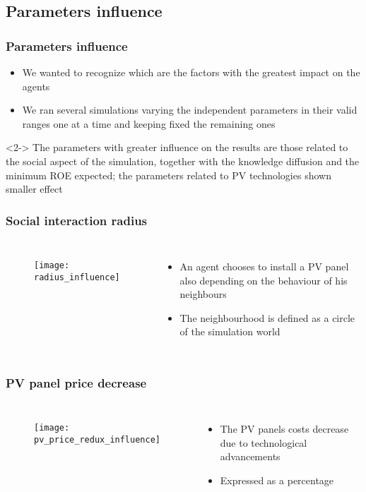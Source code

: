 \documentclass{beamer}
\begin{document}
\subsection{Parameters influence}
	\begin{frame}
	\frametitle{Parameters influence}
		\begin{itemize}
			\item We wanted to recognize which are the factors with the greatest impact on the agents
			\item We ran several simulations varying the independent parameters in their valid ranges one at a time and keeping fixed the remaining ones
		\end{itemize}
		\begin{block}<2->{}
		The parameters with greater influence on the results are those related to the social aspect of the simulation, together with the knowledge diffusion and the minimum ROE expected; the parameters related to PV technologies shown smaller effect
		\end{block}
	\end{frame}
	
	\begin{frame}
	\frametitle{Social interaction radius}
		\begin{columns}
  			\column{.6\textwidth}
			\begin{figure}
			\texttt{[image: radius\_influence]}
			\end{figure}
			\column{.4\textwidth}
			\begin{itemize}
				\item An agent chooses to install a PV panel also depending on the behaviour of his neighbours
				\item The neighbourhood is defined as a circle of the simulation world
			\end{itemize}
		\end{columns}
	\end{frame}
	
	\begin{frame}
	\frametitle{PV panel price decrease}
		\begin{columns}
			\begin{figure}
			\texttt{[image: pv\_price\_redux\_influence]}
			\end{figure}
			\begin{itemize}
				\item The PV panels costs decrease due to technological advancements
				\item Expressed as a percentage
			\end{itemize}
		\end{columns}
	\end{frame}
  	
\end{document}
